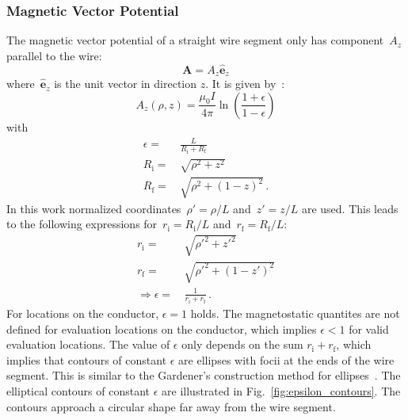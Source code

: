 \subsubsection{Magnetic Vector Potential}
\label{sec:methods_sws_vecpot}
The magnetic vector potential of a straight wire segment
only has component~$A_z$ parallel to the wire:
\begin{equation}
 \mathbf{A} = A_z \hat{\mathbf{e}}_z
\end{equation}
where~$\hat{\mathbf{e}}_z$ is the unit vector in direction $z$.
It is given by~\cite{hanson_hirshman_2002}:
\begin{equation}
  A_z(\rho, z) = \frac{\mu_0 I}{4 \pi} \ln \left( \frac{1 + \epsilon}{1 - \epsilon} \right)
\end{equation}
with
\begin{align}
  \epsilon =&\, \frac{L}{R_\mathrm{i} + R_\mathrm{f}} \\
       R_\mathrm{i} =&\, \sqrt{\rho^2 + z^2} \\
       R_\mathrm{f} =&\, \sqrt{\rho^2 + (1 - z)^2} \, .
\end{align}
In this work normalized coordinates~$\rho' = \rho/L$ and~$z' = z/L$ are used.
This leads to the following expressions
for~$r_\mathrm{i} = R_\mathrm{i}/L$ and~$r_\mathrm{f} = R_\mathrm{f}/L$:
\begin{align}
  r_\mathrm{i} =&\, \sqrt{{\rho'}^2 +      {z'}^2 }       \label{eqn:r_i_default} \\
  r_\mathrm{f} =&\, \sqrt{{\rho'}^2 + (1 - {z'})^2}       \label{eqn:r_f_default} \\
  \Rightarrow
  \epsilon     =&\, \frac{1}{r_\mathrm{i} + r_\mathrm{f}} \label{eqn:eps_default}\, .
\end{align}
For locations on the conductor, $\epsilon = 1$ holds.
The magnetostatic quantites are not defined for evaluation locations on the conductor,
which implies $\epsilon < 1$ for valid evaluation locations.
The value of $\epsilon$ only depends on the sum $r_\mathrm{i} + r_\mathrm{f}$,
which implies that contours of constant $\epsilon$ are ellipses with focii at the ends of the wire segment.
This is similar to the Gardener's construction method for ellipses~\cite{dawson_2021}.
The elliptical contours of constant $\epsilon$ are illustrated in Fig.~\ref{fig:epsilon_contours}.
The contours approach a circular shape far away from the wire segment.
